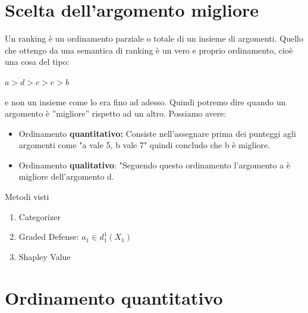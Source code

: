 \section{Scelta dell’argomento migliore}
Un ranking è un ordinamento parziale o totale di un insieme di argomenti. Quello che ottengo da una semantica di ranking è un vero e proprio ordinamento, cioè una cosa del tipo:
\begin{center}
    $a > d > c > e >b$
\end{center}
e non un insieme come lo era fino ad adesso. Quindi potremo dire quando un argomento è ”migliore” rispetto ad un altro. Possiamo avere:
\begin{itemize}
    \item Ordinamento \textbf{quantitativo:} Consiste nell’assegnare prima dei punteggi agli argomenti come "a vale 5, b vale 7" quindi concludo che b è migliore.
    \item Ordinamento \textbf{qualitativo}: "Seguendo questo ordinamento l’argomento a è migliore dell’argomento d.
\end{itemize}
\begin{center}
    Metodi visti
\end{center}
\begin{enumerate}
    \item Categorizer
    \item Graded Defense: $a_1 \in d^1_{1} (X_1)$
    \item Shapley Value
\end{enumerate}
\section{Ordinamento quantitativo}
